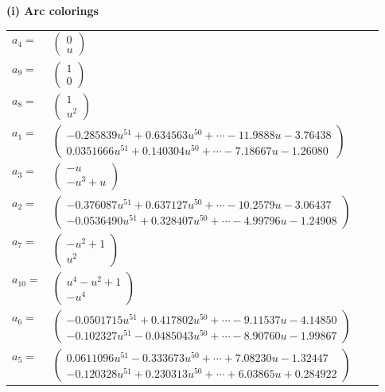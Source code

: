 \documentclass[1p]{elsarticle_modified}
\theoremstyle{definition}
\begin{document}
\flushleft \textbf{(i) Arc colorings}\\
\begin{tabular}{m{7pt} m{180pt} m{7pt} m{180pt} }
\flushright $a_{4}=$&$\begin{pmatrix}0\\u\end{pmatrix}$ \\
\flushright $a_{9}=$&$\begin{pmatrix}1\\0\end{pmatrix}$ \\
\flushright $a_{8}=$&$\begin{pmatrix}1\\u^2\end{pmatrix}$ \\
\flushright $a_{1}=$&$\begin{pmatrix}-0.285839 u^{51}+0.634563 u^{50}+\cdots-11.9888 u-3.76438\\0.0351666 u^{51}+0.140304 u^{50}+\cdots-7.18667 u-1.26080\end{pmatrix}$ \\
\flushright $a_{3}=$&$\begin{pmatrix}- u\\- u^3+u\end{pmatrix}$ \\
\flushright $a_{2}=$&$\begin{pmatrix}-0.376087 u^{51}+0.637127 u^{50}+\cdots-10.2579 u-3.06437\\-0.0536490 u^{51}+0.328407 u^{50}+\cdots-4.99796 u-1.24908\end{pmatrix}$ \\
\flushright $a_{7}=$&$\begin{pmatrix}- u^2+1\\u^2\end{pmatrix}$ \\
\flushright $a_{10}=$&$\begin{pmatrix}u^4- u^2+1\\- u^4\end{pmatrix}$ \\
\flushright $a_{6}=$&$\begin{pmatrix}-0.0501715 u^{51}+0.417802 u^{50}+\cdots-9.11537 u-4.14850\\-0.102327 u^{51}-0.0485043 u^{50}+\cdots-8.90760 u-1.99867\end{pmatrix}$ \\
\flushright $a_{5}=$&$\begin{pmatrix}0.0611096 u^{51}-0.333673 u^{50}+\cdots+7.08230 u-1.32447\\-0.120328 u^{51}+0.230313 u^{50}+\cdots+6.03865 u+0.284922\end{pmatrix}$ \\

\end{tabular}
\end{document}
